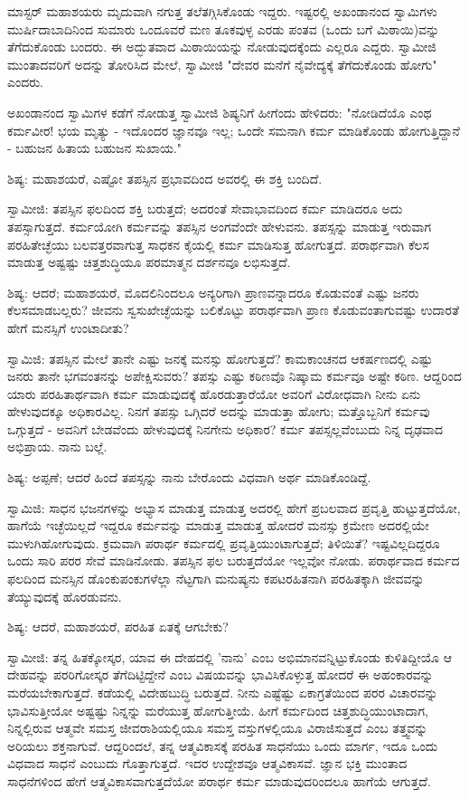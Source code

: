 ಮಾಸ್ಟರ್ ಮಹಾಶಯರು ಮೃದುವಾಗಿ ನಗುತ್ತ ತಲೆತಗ್ಗಿಸಿಕೊಂಡು ಇದ್ದರು. ಇಷ್ಟರಲ್ಲಿ ಅಖಂಡಾನಂದ ಸ್ವಾಮಿಗಳು ಮುರ್ಷಿದಾಬಾದಿನಿಂದ ಸುಮಾರು ಒಂದೂವರೆ ಮಣ ತೂಕವುಳ್ಳ ಎರಡು ಪಂತವ (ಒಂದು ಬಗೆ ಮಿಠಾಯಿ)ವನ್ನು ತೆಗೆದುಕೊಂಡು ಬಂದರು. ಈ ಅದ್ಭುತವಾದ ಮಿಠಾಯಿಯನ್ನು ನೋಡುವುದಕ್ಕೆಂದು ಎಲ್ಲರೂ ಎದ್ದರು. ಸ್ವಾಮೀಜಿ ಮುಂತಾದವರಿಗೆ ಅದನ್ನು ತೋರಿಸಿದ ಮೇಲೆ, ಸ್ವಾಮೀಜಿ "ದೇವರ ಮನೆಗೆ ನೈವೇದ್ಯಕ್ಕೆ ತೆಗೆದುಕೊಂಡು ಹೋಗು" ಎಂದರು.

ಅಖಂಡಾನಂದ ಸ್ವಾಮಿಗಳ ಕಡೆಗೆ ನೋಡುತ್ತ ಸ್ವಾಮೀಜಿ ಶಿಷ್ಯನಿಗೆ ಹೀಗೆಂದು ಹೇಳಿದರು: "ನೋಡಿದೆಯೊ ಎಂಥ ಕರ್ಮವೀರ! ಭಯ ಮೃತ್ಯು - ಇದೊಂದರ ಜ್ಞಾನವೂ ಇಲ್ಲ; ಒಂದೇ ಸಮನಾಗಿ ಕರ್ಮ ಮಾಡಿಕೊಂಡು ಹೋಗುತ್ತಿದ್ದಾನೆ - ಬಹುಜನ ಹಿತಾಯ ಬಹುಜನ ಸುಖಾಯ."

ಶಿಷ್ಯ: ಮಹಾಶಯರೆ, ಎಷ್ಟೋ ತಪಸ್ಸಿನ ಪ್ರಭಾವದಿಂದ ಅವರಲ್ಲಿ ಈ ಶಕ್ತಿ ಬಂದಿದೆ.

ಸ್ವಾಮೀಜಿ: ತಪಸ್ಸಿನ ಫಲದಿಂದ ಶಕ್ತಿ ಬರುತ್ತದೆ; ಅದರಂತೆ ಸೇವಾಭಾವದಿಂದ ಕರ್ಮ ಮಾಡಿದರೂ ಅದು ತಪಸ್ಸಾಗುತ್ತದೆ. ಕರ್ಮಯೋಗಿ ಕರ್ಮವನ್ನು ತಪಸ್ಸಿನ ಅಂಗವೆಂದೇ ಹೇಳುವನು. ತಪಸ್ಸನ್ನು ಮಾಡುತ್ತ ಇರುವಾಗ ಪರಹಿತೇಚ್ಛೆಯು ಬಲವತ್ತರವಾಗುತ್ತ ಸಾಧಕನ ಕೈಯಲ್ಲಿ ಕರ್ಮ ಮಾಡಿಸುತ್ತ ಹೋಗುತ್ತದೆ. ಪರಾರ್ಥವಾಗಿ ಕೆಲಸ ಮಾಡುತ್ತ ಅಷ್ಟಷ್ಟು ಚಿತ್ತಶುದ್ಧಿಯೂ ಪರಮಾತ್ಮನ ದರ್ಶನವೂ ಲಭಿಸುತ್ತದೆ.

ಶಿಷ್ಯ: ಆದರೆ; ಮಹಾಶಯರೆ, ಮೊದಲಿನಿಂದಲೂ ಅನ್ಯರಿಗಾಗಿ ಪ್ರಾಣವನ್ನಾದರೂ ಕೊಡುವಂತೆ ಎಷ್ಟು ಜನರು ಕೆಲಸಮಾಡಬಲ್ಲರು? ಜೀವನು ಸ್ವಸುಖೇಚ್ಛೆಯನ್ನು ಬಲಿಕೊಟ್ಟು ಪರಾರ್ಥವಾಗಿ ಪ್ರಾಣ ಕೊಡುವಂತಾಗುವಷ್ಟು ಉದಾರತೆ ಹೇಗೆ ಮನಸ್ಸಿಗೆ ಉಂಟಾದೀತು?

ಸ್ವಾಮಿಜಿ: ತಪಸ್ಸಿನ ಮೇಲೆ ತಾನೇ ಎಷ್ಟು ಜನಕ್ಕೆ ಮನಸ್ಸು ಹೋಗುತ್ತದೆ? ಕಾಮಕಾಂಚನದ ಆಕರ್ಷಣದಲ್ಲಿ ಎಷ್ಟು ಜನರು ತಾನೇ ಭಗವಂತನನ್ನು ಅಪೇಕ್ಷಿಸುವರು? ತಪಸ್ಸು ಎಷ್ಟು ಕಠಿಣವೊ ನಿಷ್ಕಾಮ ಕರ್ಮವೂ ಅಷ್ಟೇ ಕಠಿಣ. ಆದ್ದರಿಂದ ಯಾರು ಪರಹಿತಾರ್ಥವಾಗಿ ಕರ್ಮ ಮಾಡುವುದಕ್ಕೆ ಹೊರಡುತ್ತಾರೆಯೋ ಅವರಿಗೆ ವಿರೋಧವಾಗಿ ನೀನು ಏನು ಹೇಳುವುದಕ್ಕೂ ಅಧಿಕಾರವಿಲ್ಲ. ನಿನಗೆ ತಪಸ್ಸು ಒಗ್ಗಿದರೆ ಅದನ್ನು ಮಾಡುತ್ತಾ ಹೋಗು; ಮತ್ತೊಬ್ಬನಿಗೆ ಕರ್ಮವು ಒಗ್ಗುತ್ತದೆ - ಅವನಿಗೆ ಬೇಡವೆಂದು ಹೇಳುವುದಕ್ಕೆ ನಿನಗೇನು ಅಧಿಕಾರ? ಕರ್ಮ ತಪಸ್ಸಲ್ಲವೆಂಬುದು ನಿನ್ನ ದೃಢವಾದ ಅಭಿಪ್ರಾಯ. ನಾನು ಬಲ್ಲೆ.

ಶಿಷ್ಯ: ಅಪ್ಪಣೆ; ಆದರೆ ಹಿಂದೆ ತಪಸ್ಸನ್ನು ನಾನು ಬೇರೊಂದು ವಿಧವಾಗಿ ಅರ್ಥ ಮಾಡಿಕೊಂಡಿದ್ದೆ.

ಸ್ವಾಮಿಜಿ: ಸಾಧನ ಭಜನಗಳನ್ನು ಅಭ್ಯಾಸ ಮಾಡುತ್ತ ಮಾಡುತ್ತ ಅದರಲ್ಲಿ ಹೇಗೆ ಪ್ರಬಲವಾದ ಪ್ರವೃತ್ತಿ ಹುಟ್ಟುತ್ತದೆಯೋ, ಹಾಗೆಯೆ ಇಚ್ಛೆಯಿಲ್ಲದೆ ಇದ್ದರೂ ಕರ್ಮವನ್ನು ಮಾಡುತ್ತ ಮಾಡುತ್ತ ಹೋದರೆ ಮನಸ್ಸು ಕ್ರಮೇಣ ಅದರಲ್ಲಿಯೇ ಮುಳುಗಿಹೋಗುವುದು. ಕ್ರಮವಾಗಿ ಪರಾರ್ಥ ಕರ್ಮದಲ್ಲಿ ಪ್ರವೃತ್ತಿಯುಂಟಾಗುತ್ತದೆ; ತಿಳಿಯಿತೆ? ಇಷ್ಟವಿಲ್ಲದಿದ್ದರೂ ಒಂದು ಸಾರಿ ಪರರ ಸೇವೆ ಮಾಡಿನೋಡು. ತಪಸ್ಸಿನ ಫಲ ಬರುತ್ತದೆಯೋ ಇಲ್ಲವೋ ನೋಡು. ಪರಾರ್ಥವಾದ ಕರ್ಮದ ಫಲದಿಂದ ಮನಸ್ಸಿನ ಡೊಂಕುಪಂಕುಗಳೆಲ್ಲಾ ನೆಟ್ಟಗಾಗಿ ಮನುಷ್ಯನು ಕಪಟರಹಿತನಾಗಿ ಪರಹಿತಕ್ಕಾಗಿ ಜೀವವನ್ನು ತೆಯ್ಯುವುದಕ್ಕೆ ಹೊರಡುವನು.

ಶಿಷ್ಯ: ಆದರೆ, ಮಹಾಶಯರೆ, ಪರಹಿತ ಏತಕ್ಕೆ ಆಗಬೇಕು?

ಸ್ವಾಮೀಜಿ: ತನ್ನ ಹಿತಕ್ಕೋಸ್ಕರ, ಯಾವ ಈ ದೇಹದಲ್ಲಿ 'ನಾನು' ಎಂಬ ಅಭಿಮಾನವನ್ನಿಟ್ಟುಕೊಂಡು ಕುಳಿತಿದ್ದೀಯೊ ಆ ದೇಹವನ್ನು ಪರರಿಗೋಸ್ಕರ ತೆಗೆದಿಟ್ಟಿದ್ದೇನೆ ಎಂಬ ವಿಷಯವನ್ನು ಭಾವಿಸಿಕೊಳ್ಳುತ್ತ ಹೋದರೆ ಈ ಅಹಂಕಾರವನ್ನು ಮರೆಯಬೇಕಾಗುತ್ತದೆ. ಕಡೆಯಲ್ಲಿ ವಿದೇಹಬುದ್ಧಿ ಬರುತ್ತದೆ. ನೀನು ಎಷ್ಟೆಷ್ಟು ಏಕಾಗ್ರತೆಯಿಂದ ಪರರ ವಿಚಾರವನ್ನು ಭಾವಿಸುತ್ತೀಯೋ ಅಷ್ಟಷ್ಟು ನಿನ್ನನ್ನು ಮರೆಯುತ್ತ ಹೋಗುತ್ತೀಯೆ. ಹೀಗೆ ಕರ್ಮದಿಂದ ಚಿತ್ತಶುದ್ಧಿಯುಂಟಾದಾಗ, ನಿನ್ನಲ್ಲಿರುವ ಆತ್ಮವೇ ಸಮಸ್ತ ಜೀವರಾಶಿಯಲ್ಲಿಯೂ ಸಮಸ್ತ ವಸ್ತುಗಳಲ್ಲಿಯೂ ವಿರಾಜಿಸುತ್ತದೆ ಎಂಬ ತತ್ತ್ವವನ್ನು ಅರಿಯಲು ಶಕ್ತನಾಗುವೆ. ಆದ್ದರಿಂದಲೆ, ತನ್ನ ಆತ್ಮವಿಕಾಸಕ್ಕೆ ಪರಹಿತ ಸಾಧನೆಯು ಒಂದು ಮಾರ್ಗ, ಇದೂ ಒಂದು ವಿಧವಾದ ಸಾಧನೆ ಎಂಬುದು ಗೊತ್ತಾಗುತ್ತದೆ. ಇದರ ಉದ್ದೇಶವೂ ಆತ್ಮವಿಕಾಸವೆ. ಜ್ಞಾನ ಭಕ್ತಿ ಮುಂತಾದ ಸಾಧನೆಗಳಿಂದ ಹೇಗೆ ಆತ್ಮವಿಕಾಸವಾಗುತ್ತದೆಯೋ ಪರಾರ್ಥ ಕರ್ಮ ಮಾಡುವುದರಿಂದಲೂ ಹಾಗೆಯೆ ಆಗುತ್ತದೆ.

